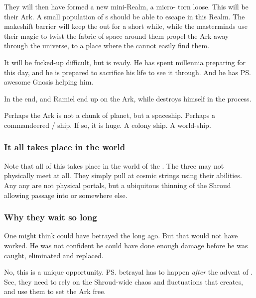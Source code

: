\begin{garbage}
They will then have formed a new mini-Realm, a micro-\Miith{} torn loose. 
This will be their Ark. 
A small population of \Miithian s should be able to escape in this Realm. 
The makeshift barrier will keep the \banes{} out for a short while, while the masterminds use their magic to twist the fabric of space around them propel the Ark away through the universe, to a place where the \banes{} cannot easily find them. 

It will be fucked-up difficult, but \Azraid{} is ready. 
He has spent millennia preparing for this day, and he is prepared to sacrifice his life to see it through. 
And he has \ps{\Ishnaruchaefir} awesome Gnosis helping him. 

In the end, \Ishnaruchaefir{} and Ramiel end up on the Ark, while \Azraid{} destroys himself in the process. 

Perhaps the Ark is not a chunk of planet, but a spaceship. 
Perhaps a commandeered \bane/\resphan{} ship. 
If so, it is huge. 
A colony ship. 
A world-ship. 





\subsubsection{It all takes place in the \matrix{} world}
Note that all of this takes place in the world of the \matrices. 
The three may not physically meet at all. 
They simply pull at cosmic strings using their \vertex{} abilities. 
Any any  are not physical portals, but a ubiquitous thinning of the Shroud allowing passage into \Erebos{} or somewhere else. 





\subsubsection{Why they wait so long}
One might think \Azraid{} could have betrayed the \banes{} long ago. 
But that would not have worked. 
He was not confident he could have done enough damage before he was caught, eliminated and replaced. 

No, this is a unique opportunity. 
\ps{\Azraid} betrayal has to happen \emph{after} the advent of \Lithrim. 
See, they need to rely on the Shroud-wide chaos and fluctuations that \Lithrim{} creates, and use them to set the Ark free. 










\end{garbage}
